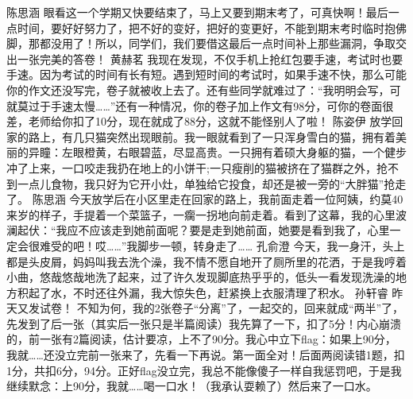 {}\markdownRendererInterblockSeparator
{}陈思涵\markdownRendererInterblockSeparator
{}眼看这一个学期又快要结束了，马上又要到期末考了，可真快啊！最后一点时间，要好好努力了，把不好的变好，把好的变更好，不能到期末考时临时抱佛脚，那都没用了！所以，同学们，我们要借这最后一点时间补上那些漏洞，争取交出一张完美的答卷！\markdownRendererInterblockSeparator
{}\markdownRendererInterblockSeparator
{}黄赫茗\markdownRendererInterblockSeparator
{}我现在发现，不仅手机上抢红包要手速，考试时也要手速。因为考试的时间有长有短。遇到短时间的考试时，如果手速不快，那么可能你的作文还没写完，卷子就被收上去了。还有些同学就难过了：“我明明会写，可就莫过于手速太慢……”还有一种情况，你的卷子加上作文有98分，可你的卷面很差，老师给你扣了10分，现在就成了88分，这就不能怪别人了啦！\markdownRendererInterblockSeparator
{}\markdownRendererInterblockSeparator
{}陈姿伊\markdownRendererInterblockSeparator
{}放学回家的路上，有几只猫突然出现眼前。我一眼就看到了一只浑身雪白的猫，拥有着美丽的异瞳：左眼橙黄，右眼碧蓝，尽显高贵。一只拥有着硕大身躯的猫，一个健步冲了上来，一口咬走我扔在地上的小饼干;一只瘦削的猫被挤在了猫群之外，抢不到一点儿食物，我只好为它开小灶，单独给它投食，却还是被一旁的“大胖猫”抢走了。 \markdownRendererInterblockSeparator
{}\markdownRendererInterblockSeparator
{}陈思涵\markdownRendererInterblockSeparator
{}今天放学后在小区里走在回家的路上，我前面走着一位阿姨，约莫40来岁的样子，手提着一个菜篮子，一瘸一拐地向前走着。看到了这幕，我的心里波澜起伏：“我应不应该走到她前面呢？要是走到她前面，她要是看到我了，心里一定会很难受的吧！哎……”我脚步一顿，转身走了……\markdownRendererInterblockSeparator
{}\markdownRendererInterblockSeparator
{}孔俞澄\markdownRendererInterblockSeparator
{}今天，我一身汗，头上都是头皮屑，妈妈叫我去洗个澡，我不情不愿自地开了厕所里的花洒，于是我哼着小曲，悠哉悠哉地洗了起来，过了许久发现脚底热乎乎的，低头一看发现洗澡的地方积起了水，不时还往外漏，我大惊失色，赶紧换上衣服清理了积水。\markdownRendererInterblockSeparator
{}\markdownRendererInterblockSeparator
{}孙轩睿\markdownRendererInterblockSeparator
{}昨天又发试卷！\markdownRendererInterblockSeparator
{}不知为何，我的2张卷子“分离”了，一起交的，回来就成“两半”了，先发到了后一张（其实后一张只是半篇阅读）我先算了一下，扣了5分！内心崩溃的，前一张有2篇阅读，估计要凉，上不了90分。我心中立下flag：如果上90分，我就……还没立完前一张来了，先看一下再说。第一面全对！后面两阅读错1题，扣1分，共扣6分，94分。正好flag没立完，我总不能像傻子一样自我惩罚吧，于是我继续默念：上90分，我就……喝一口水！（我承认耍赖了）然后来了一口水。\markdownRendererInterblockSeparator
